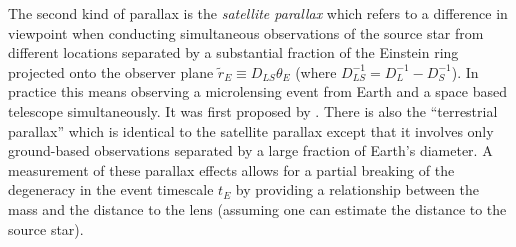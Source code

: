 \documentclass[12pt]{report}
\begin{document}
The second kind of parallax is the \emph{satellite parallax} which refers to a
difference in viewpoint when conducting simultaneous observations of the source
star from different locations separated by a substantial fraction of the
Einstein ring projected onto the observer plane $\tilde{r}_E\equiv
    D_{LS}\theta_E$ (where $D_{LS}^{-1}=D_L^{-1} - D_S^{-1}$). In practice this
means observing a microlensing event from Earth and a space based telescope
simultaneously. It was first proposed by \citet{1966MNRAS.134..315R}. There is
also the ``terrestrial parallax'' which is identical to the satellite parallax
except that it involves only ground-based observations separated by a large
fraction of Earth's diameter. A measurement of these parallax effects allows
for a partial breaking of the degeneracy in the event timescale $t_E$ by
providing a relationship between the mass and the distance to the lens
(assuming one can estimate the distance to the source star).
\end{document}
